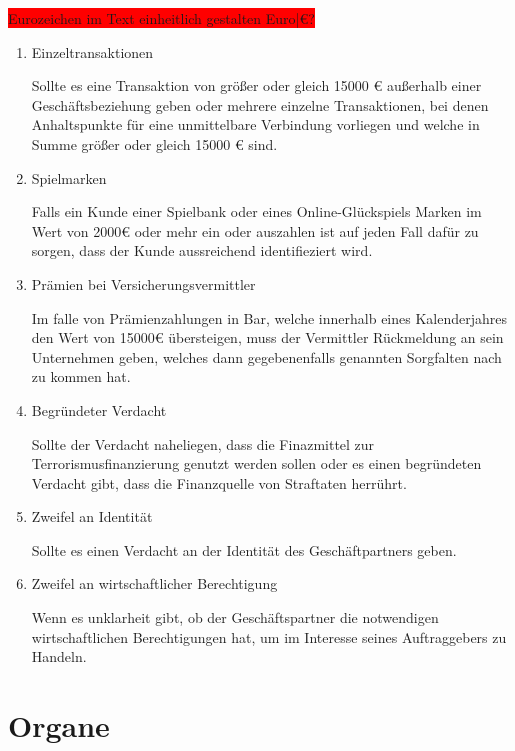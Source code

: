 \documentclass{article}
\begin{document}
        \colorbox{red}{Eurozeichen im Text einheitlich gestalten Euro|€?}
        \begin{enumerate}

            \item Einzeltransaktionen

                Sollte es eine Transaktion von größer oder gleich 15000 € außerhalb einer Geschäftsbeziehung geben oder mehrere einzelne Transaktionen, bei denen Anhaltspunkte für eine unmittelbare Verbindung vorliegen und welche in Summe größer oder gleich 15000 € sind.

            \item Spielmarken

                Falls ein Kunde einer Spielbank oder eines Online-Glückspiels Marken im Wert von 2000€ oder mehr ein oder auszahlen ist auf jeden Fall dafür zu sorgen, dass der Kunde aussreichend identifieziert wird.

            \item Prämien bei Versicherungsvermittler

                Im falle von Prämienzahlungen in Bar, welche innerhalb eines Kalenderjahres den Wert von 15000€ übersteigen, muss der Vermittler Rückmeldung an sein Unternehmen geben, welches dann gegebenenfalls genannten Sorgfalten nach zu kommen hat.

            \item Begründeter Verdacht 

                Sollte der Verdacht naheliegen, dass die Finazmittel zur Terrorismusfinanzierung genutzt werden sollen oder es einen begründeten Verdacht gibt, dass die Finanzquelle von Straftaten herrührt.

            \item Zweifel an Identität

                Sollte es einen Verdacht an der Identität des Geschäftpartners geben.

            \item Zweifel an wirtschaftlicher Berechtigung

                Wenn es unklarheit gibt, ob der Geschäftspartner die notwendigen wirtschaftlichen Berechtigungen hat, um im Interesse seines Auftraggebers zu Handeln.

        \end{enumerate}    
    

    \section[Organe]{Organe}
\end{document}
